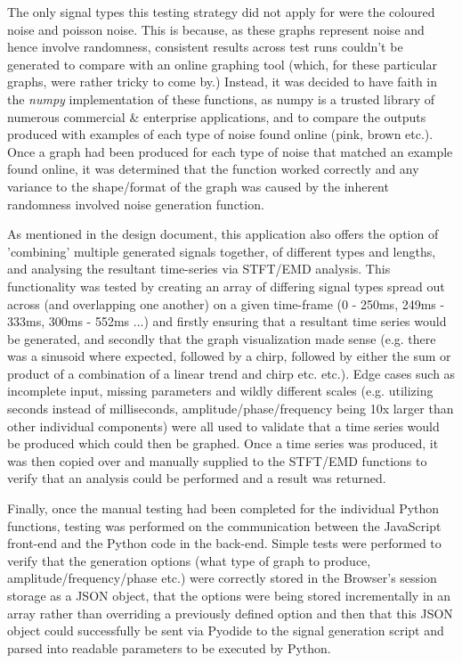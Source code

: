 The only signal types this testing strategy did not apply for were the coloured noise and poisson noise. This is because, as these graphs represent noise and hence involve randomness, consistent results across test runs couldn't be generated to compare with an online graphing tool (which, for these particular graphs, were rather tricky to come by.) 
Instead, it was decided to have faith in the {\it numpy} implementation of these functions, as numpy is a trusted library of numerous commercial \& enterprise applications, and to compare the outputs produced with examples of each type of noise found online (pink, brown etc.). Once a graph had been produced for each type of noise that matched an example found online, it was determined that the function worked correctly and any variance to the shape/format of the graph was caused by the inherent randomness involved noise generation function.

As mentioned in the design document, this application also offers the option of 'combining' multiple generated signals together, of different types and lengths, and analysing the resultant time-series via STFT/EMD analysis. This functionality was tested by creating an array of differing signal types spread out across (and overlapping one another) on a given time-frame (0 -\> 250ms, 249ms -\> 333ms, 300ms -\> 552ms ...) and firstly ensuring that a resultant time series would be generated, and secondly that the graph visualization made sense (e.g. there was a sinusoid where expected, followed by a chirp, followed by either the sum or product of a combination of a linear trend and chirp etc. etc.). Edge cases such as incomplete input, missing parameters and wildly different scales (e.g. utilizing seconds instead of milliseconds, amplitude/phase/frequency being 10x larger than other individual components) were all used to validate that a time series would be produced which could then be graphed. Once a time series was produced, it was then copied over and manually supplied to the STFT/EMD functions to verify that an analysis could be performed and a result was returned. 

Finally, once the manual testing had been completed for the individual Python functions, testing was performed on the communication between the JavaScript front-end and the Python code in the back-end. Simple tests were performed to verify that the generation options (what type of graph to produce, amplitude/frequency/phase etc.) were correctly stored in the Browser's session storage as a JSON object, that the options were being stored incrementally in an array rather than overriding a previously defined option and then that this JSON object could successfully be sent via Pyodide to the signal generation script and parsed into readable parameters to be executed by Python. 

